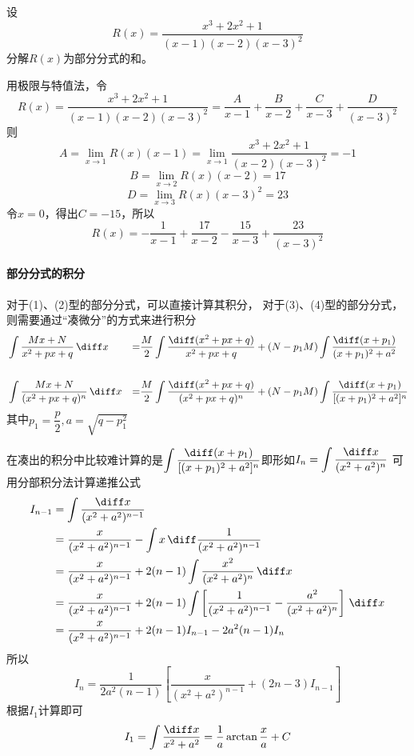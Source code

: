\begin{example}
    设
    \[ R(x) = \frac{x^3+2x^2+1}{(x-1)(x-2)(x-3)^2} \]
    分解$R(x)$为部分分式的和。
\end{example}
\begin{solution}
    用极限与特值法，令
    \[ R(x) = \frac{x^3+2x^2+1}{(x-1)(x-2)(x-3)^2} = \frac{A}{x-1} + \frac{B}{x-2} + \frac{C}{x-3} + \frac{D}{(x-3)^2} \]
    则
    \[ A = \lim_{x\to 1}R(x)(x-1) = \lim_{x\to 1}\frac{x^3+2x^2+1}{(x-2)(x-3)^2} = -1 \]
    \[ B = \lim_{x\to 2}R(x)(x-2) = 17 \]
    \[ D = \lim_{x\to 3}R(x)(x-3)^2 = 23 \]
    令$x=0$，得出$C=-15$，所以
    \[ R(x) = -\frac{1}{x-1} + \frac{17}{x-2} - \frac{15}{x-3} + \frac{23}{(x-3)^2} \]
\end{solution}



\paragraph{部分分式的积分}
对于(1)、(2)型的部分分式，可以直接计算其积分，
对于(3)、(4)型的部分分式，则需要通过“凑微分”的方式来进行积分
\begin{alignat*}{3}
     & \int \frac{Mx+N}{x^2+px+q}\,\diff x     & = & \frac{M}{2} \int \frac{\diff(x^2+px+q)}{x^2+px+q} + (N-p_1M)\int\frac{\diff(x+p_1)}{(x+p_1)^2+a^2}       \\
    \\
     & \int \frac{Mx+N}{(x^2+px+q)^n}\,\diff x & = & \frac{M}{2}\int\frac{\diff(x^2+px+q)}{(x^2+px+q)^n} + (N-p_1M)\int\frac{\diff(x+p_1)}{[(x+p_1)^2+a^2]^n}
\end{alignat*}
其中$p_1=\dfrac{p}{2},a=\sqrt{q-p_1^2}$

在凑出的积分中比较难计算的是$\displaystyle\int\frac{\diff(x+p_1)}{[(x+p_1)^2+a^2]^n} $即形如$\displaystyle I_n = \int\frac{\diff x}{(x^2+a^2)^n} $
可用分部积分法计算递推公式
\begin{align*}
    I_{n-1} & = \int\frac{\diff x}{(x^2+a^2)^{n-1}}                                                                                \\
            & = \frac{x}{(x^2+a^2)^{n-1}} - \int x\,\diff\frac{1}{(x^2+a^2)^{n-1}}                                                 \\
            & = \frac{x}{(x^2+a^2)^{n-1}} + 2(n-1)\int \frac{x^2}{(x^2+a^2)^n}\,\diff x                                            \\
            & = \frac{x}{(x^2+a^2)^{n-1}} + 2(n-1)\int \left[ \frac{1}{(x^2+a^2)^{n-1}} - \frac{a^2}{(x^2+a^2)^n} \right]\,\diff x \\
            & = \frac{x}{(x^2+a^2)^{n-1}} + 2(n-1)I_{n-1} - 2a^2(n-1)I_n
\end{align*}
所以
\[ I_n = \frac{1}{2a^2(n-1)}\left[ \frac{x}{(x^2+a^2)^{n-1}} + (2n-3)I_{n-1} \right] \]
根据$I_1$计算即可
\[ I_1 = \int\frac{\diff x}{x^2+a^2} = \frac{1}{a}\arctan \frac{x}{a} + C \]


